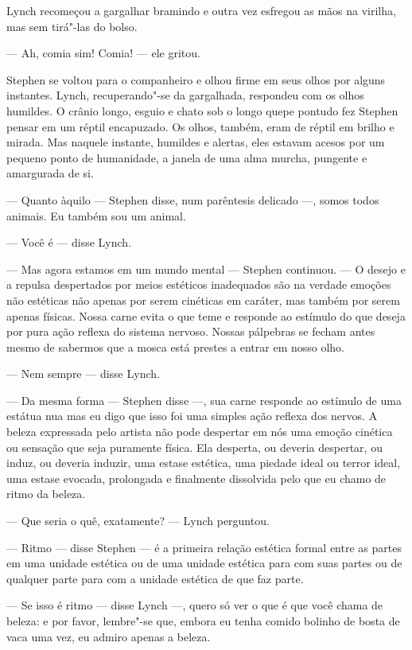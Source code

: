 Lynch recomeçou a gargalhar bramindo e outra vez esfregou as mãos na
virilha, mas sem tirá"-las do bolso.

 --- Ah, comia sim! Comia! --- ele gritou.

Stephen se voltou para o companheiro e olhou firme em seus olhos por
alguns instantes. Lynch, recuperando"-se da gargalhada, respondeu com os
olhos humildes. O crânio longo, esguio e chato sob o longo quepe pontudo
fez Stephen pensar em um réptil encapuzado. Os olhos, também, eram de
réptil em brilho e mirada. Mas naquele instante, humildes e alertas,
eles estavam acesos por um pequeno ponto de humanidade, a janela de uma
alma murcha, pungente e amargurada de si.

 --- Quanto àquilo --- Stephen disse, num parêntesis delicado ---, somos todos
animais. Eu também sou um animal.

 --- Você é --- disse Lynch.

 --- Mas agora estamos em um mundo mental --- Stephen continuou. --- O desejo e
a repulsa despertados por meios estéticos inadequados são na verdade
emoções não estéticas não apenas por serem cinéticas em caráter, mas
também por serem apenas físicas. Nossa carne evita o que teme e
responde ao estímulo do que deseja por pura ação reflexa do sistema
nervoso. Nossas pálpebras se fecham antes mesmo de sabermos que a mosca
está prestes a entrar em nosso olho.

 --- Nem sempre --- disse Lynch.

 --- Da mesma forma --- Stephen disse ---, sua carne responde ao estímulo de uma
estátua nua mas eu digo que isso foi uma simples ação reflexa dos
nervos. A beleza expressada pelo artista não pode despertar em nós uma
emoção cinética ou sensação que seja puramente física. Ela desperta, ou
deveria despertar, ou induz, ou deveria induzir, uma estase estética,
uma piedade ideal ou terror ideal, uma estase evocada, prolongada e
finalmente dissolvida pelo que eu chamo de ritmo da beleza.

 --- Que seria o quê, exatamente? --- Lynch perguntou.

 --- Ritmo --- disse Stephen --- é a primeira relação estética formal entre as
partes em uma unidade estética ou de uma unidade estética para com suas
partes ou de qualquer parte para com a unidade estética de que faz
parte.

 --- Se isso é ritmo --- disse Lynch ---, quero só ver o que é que você chama de
beleza: e por favor, lembre"-se que, embora eu tenha comido bolinho de
bosta de vaca uma vez, eu admiro apenas a beleza.

